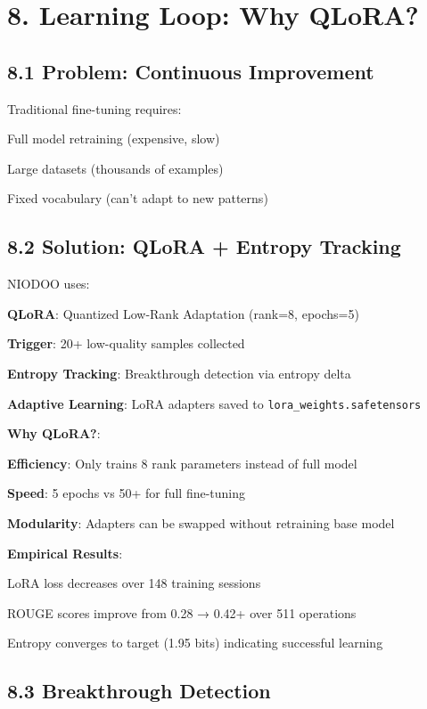 \documentclass[11pt,a4paper]{article}
\begin{document}
\section{8. Learning Loop: Why QLoRA?}

\subsection{8.1 Problem: Continuous Improvement}

Traditional fine-tuning requires:
\item Full model retraining (expensive, slow)
\item Large datasets (thousands of examples)
\item Fixed vocabulary (can't adapt to new patterns)

\subsection{8.2 Solution: QLoRA + Entropy Tracking}

NIODOO uses:
\item \textbf{QLoRA}: Quantized Low-Rank Adaptation (rank=8, epochs=5)
\item \textbf{Trigger}: 20+ low-quality samples collected
\item \textbf{Entropy Tracking}: Breakthrough detection via entropy delta
\item \textbf{Adaptive Learning}: LoRA adapters saved to \texttt{lora_weights.safetensors}

\textbf{Why QLoRA?}: 
\item \textbf{Efficiency}: Only trains 8 rank parameters instead of full model
\item \textbf{Speed}: 5 epochs vs 50+ for full fine-tuning
\item \textbf{Modularity}: Adapters can be swapped without retraining base model

\textbf{Empirical Results}: 
\item LoRA loss decreases over 148 training sessions
\item ROUGE scores improve from 0.28 → 0.42+ over 511 operations
\item Entropy converges to target (1.95 bits) indicating successful learning

\subsection{8.3 Breakthrough Detection}
\end{document}

